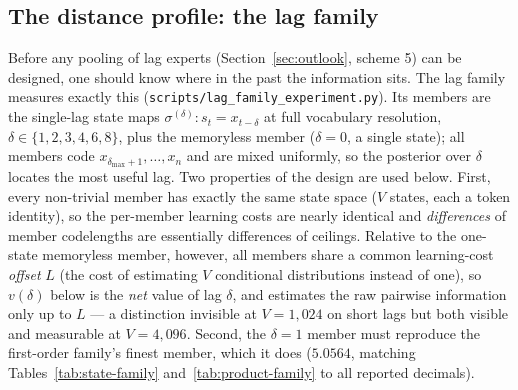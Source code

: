 \documentclass[11pt]{article}
\begin{document}
\subsection{The distance profile: the lag family}
\label{sec:lag-family}

Before any pooling of lag experts (Section~\ref{sec:outlook}, scheme 5)
can be designed, one should know where in the past the information
sits.  The lag family measures exactly this
(\texttt{scripts/lag\_family\_experiment.py}).  Its members are the
single-lag state maps $\sigma^{(\delta)}: s_t = x_{t-\delta}$ at full
vocabulary resolution, $\delta \in \{1,2,3,4,6,8\}$, plus the
memoryless member ($\delta = 0$, a single state); all members code
$x_{\delta_{\max}+1}, \dots, x_n$ and are mixed uniformly, so the
posterior over $\delta$ locates the most useful lag.  Two properties of
the design are used below.  First, every non-trivial member has exactly
the same state space ($V$ states, each a token identity), so the
per-member learning costs are nearly identical and \emph{differences}
of member codelengths are essentially differences of ceilings.
Relative to the one-state memoryless member, however, all members share
a common learning-cost \emph{offset} $L$ (the cost of estimating $V$
conditional distributions instead of one), so $v(\delta)$ below is the
\emph{net} value
of lag $\delta$, and estimates the raw pairwise information only up to
$L$ --- a distinction invisible at $V=1{,}024$ on short lags but
both visible and measurable at $V=4{,}096$.  Second, the $\delta = 1$
member must reproduce the first-order family's finest member, which it
does ($5.0564$, matching Tables~\ref{tab:state-family}
and~\ref{tab:product-family} to all reported decimals).
\end{document}
